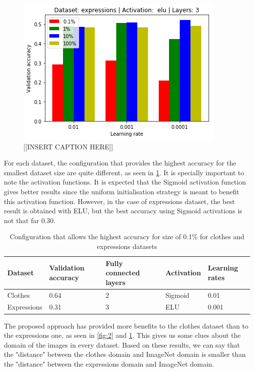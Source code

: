\documentclass{article}
\begin{document}
\begin{figure}[tb]
    \vskip 5mm
        \begin{center}
            \includegraphics[scale=0.5]{accuracy_reduction_01.png}
            \caption{[[INSERT CAPTION HERE]]}
            \label{fig:3}
        \end{center}
    \vskip -5mm
\end{figure}

For each dataset, the configuration that provides the highest accuracy for the smallest dataset size are quite different, as seen in \ref{tab:1}. It is specially important to note the activation functions. It is expected that the Sigmoid activation function gives better results since the uniform initialisation strategy is meant to benefit this activation function. However, in the case of expressions dataset, the best result is obtained with ELU, but the best accuracy using Sigmoid activations is not that far 0.30.

\begin{table}[!htb]
  \centering
  \begin{tabular}{| l | l | l | l | l |}
    \hline
    \textbf{Dataset} & \textbf{Validation accuracy} & \textbf{Fully connected layers}& \textbf{Activation} & \textbf{Learning rates}\\ \hline
    Clothes & 0.64 & 2 & Sigmoid & 0.01 \\ \hline
    Expressions & 0.31  & 3 & ELU & 0.001 \\ \hline
  \end{tabular}
  \caption{Configuration that allows the highest accuracy for size of 0.1\% for clothes and expressions datasets}
  \label{tab:1}
\end{table}

The proposed approach has provided more benefits to the clothes dataset than to the expressions one, as seen in \ref{fig:2} and \ref{fig:3}. This gives us some clues about the domain of the images in every dataset. Based on these results, we can say that the "distance" between the clothes domain and ImageNet domain is smaller than the "distance" between the expressions domain and ImageNet domain.
\end{document}
